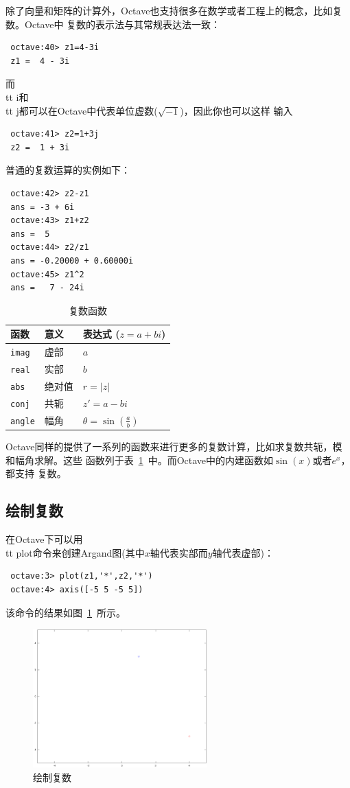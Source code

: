 \documentclass[UTF8,adobefonts]{ctexart}
\begin{document}
除了向量和矩阵的计算外，Octave也支持很多在数学或者工程上的概念，比如复数。Octave中
复数的表示法与其常规表达法一致：
\begin{verbatim}
 octave:40> z1=4-3i
 z1 =  4 - 3i
\end{verbatim}
而{\\tt i}和{\\tt j}都可以在Octave中代表单位虚数($\sqrt{-1}$)，因此你也可以这样
输入
\begin{verbatim}
 octave:41> z2=1+3j
 z2 =  1 + 3i
\end{verbatim}
普通的复数运算的实例如下：
\begin{verbatim}
 octave:42> z2-z1
 ans = -3 + 6i
 octave:43> z1+z2
 ans =  5
 octave:44> z2/z1 
 ans = -0.20000 + 0.60000i
 octave:45> z1^2
 ans =   7 - 24i
\end{verbatim}
\begin{table}
 \centering
 \begin{tabular}{|lll|}
 \hline
 函数 & 意义 & 表达式 ($z=a+bi$)\\
 \hline 
  {\tt imag} & 虚部 & $a$ \\
  {\tt real} & 实部 & $b$ \\
  {\tt abs}  & 绝对值 & $r=|z|$ \\
  {\tt conj} & 共轭 & $z'=a-bi$ \\
  {\tt angle} & 幅角 & $\theta = \sin(\frac{a}{b})$ \\
 \hline 
 \end{tabular}
 \caption{复数函数}
 \label{tab:comp}
\end{table}
Octave同样的提供了一系列的函数来进行更多的复数计算，比如求复数共轭，模和幅角求解。这些
函数列于表~\ref{tab:comp}~中。而Octave中的内建函数如$\sin(x)$或者$e^x$，都支持
复数。
\subsection{绘制复数}
在Octave下可以用{\\tt plot}命令来创建Argand图(其中$x$轴代表实部而$y$轴代表虚部)：
\begin{verbatim}
 octave:3> plot(z1,'*',z2,'*')
 octave:4> axis([-5 5 -5 5])
\end{verbatim}
该命令的结果如图~\ref{complex}~所示。
\begin{figure}
 \centering
 \includegraphics[width=0.6\textwidth]{complex.eps}
 \caption{绘制复数}
 \label{complex}
\end{figure}
\end{document}
